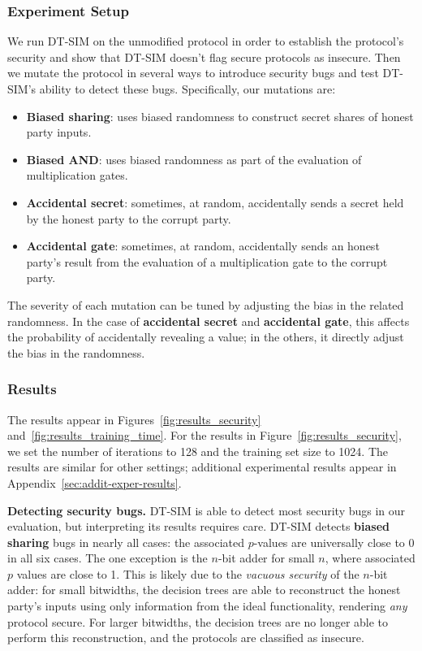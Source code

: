 \documentclass[compsoc, conference, a4paper, 10pt, times]{IEEEtran}
\renewcommand{\paragraph}[1]{\vspace*{2pt}\noindent\textbf{#1}}
\newcommand{\toolname}{\textsc{DT-SIM}\xspace}
\begin{document}
\subsubsection{Experiment Setup}
\label{sec:e2-experiment-setup}

We run \toolname on the unmodified protocol in order to establish the protocol's security
and show that \toolname doesn't flag secure protocols as insecure.
Then we mutate the protocol in several ways to introduce security bugs and test \toolname's ability to detect these bugs. Specifically, our mutations are:
%
\begin{itemize}
\item \textbf{Biased sharing}: uses biased randomness to construct secret shares of honest party inputs.
\item \textbf{Biased AND}: uses biased randomness as part of the evaluation of multiplication gates.
\item \textbf{Accidental secret}: sometimes, at random, accidentally sends a secret held by the honest party  to the corrupt party.
\item \textbf{Accidental gate}: sometimes, at random, accidentally sends an honest party's result from the evaluation of a multiplication gate to the corrupt party.
\end{itemize}
%
The severity of each mutation can be tuned by adjusting the bias in the related randomness. In the case of \textbf{accidental secret} and \textbf{accidental gate}, this affects the probability of accidentally revealing a value; in the others, it directly adjust the bias in the randomness.

\subsubsection{Results}
\label{sec:e2_results}

The results appear in Figures~\ref{fig:results_security} and~\ref{fig:results_training_time}. For the results in Figure~\ref{fig:results_security}, we set the number of iterations to 128 and the training set size to 1024. The results are similar for other settings; additional experimental results appear in Appendix~\ref{sec:addit-exper-results}.

\paragraph{Detecting security bugs.}
\toolname is able to detect most security bugs in our evaluation, but interpreting its results requires care. \toolname detects \textbf{biased sharing} bugs in nearly all cases: the associated $p$-values are universally close to 0 in all six cases. The one exception is the $n$-bit adder for small $n$, where associated $p$ values are close to 1. This is likely due to the \emph{vacuous security} of the $n$-bit adder: for small bitwidths, the decision trees are able to reconstruct the honest party's inputs using only information from the ideal functionality, rendering \emph{any} protocol secure. For larger bitwidths, the decision trees are no longer able to perform this reconstruction, and the protocols are classified as insecure.
\end{document}

